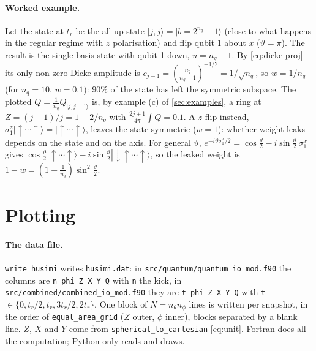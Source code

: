 \documentclass[11pt,a4paper]{article}
\newcommand{\up}{{\uparrow}}
\newcommand{\dn}{{\downarrow}}
\begin{document}
\paragraph{Worked example.} Let the state at $t_r$ be the all-up state $|j,j\rangle = |b = 2^{n_q}-1\rangle$ (close to
what happens in the regular regime with $z$ polarisation) and flip qubit 1 about $x$ ($\vartheta = \pi$). The result is
the single basis state with qubit 1 down, $u = n_q-1$. By \eqref{eq:dicke-proj} its only non-zero Dicke amplitude is $c_{j-1} =
\binom{n_q}{n_q-1}^{-1/2} = 1/\sqrt{n_q}$, so $w = 1/n_q$ (for $n_q = 10$, $w = 0.1$): $90\%$ of the state has left
the symmetric subspace. The plotted $Q = \frac{1}{n_q}Q_{|j,j-1\rangle}$ is, by example (c) of \cref{sec:examples}, a
ring at $Z = (j-1)/j = 1-2/n_q$ with $\frac{2j+1}{4\pi}\int Q = 0.1$. A $z$ flip instead, $\sigma^z_1|\up\cdots\up\rangle =
|\up\cdots\up\rangle$, leaves the state symmetric ($w = 1$): whether weight leaks depends on the state and on the axis.
For general $\vartheta$, $e^{-i\vartheta\sigma^x_1/2} = \cos\frac\vartheta2 - i\sin\frac\vartheta2\,\sigma^x_1$ gives
$\cos\frac\vartheta2|\up\cdots\up\rangle - i\sin\frac\vartheta2|\dn\up\cdots\up\rangle$, so the leaked weight is
$1-w = (1-\frac1{n_q})\sin^2\frac\vartheta2$.

\section{Plotting}\label{sec:plotting}

\paragraph{The data file.} \texttt{write\_husimi} writes \texttt{husimi.dat}: in \texttt{src/quantum/quantum\_io\_mod.f90}
the columns are \texttt{n phi Z X Y Q} with \texttt{n} the kick, in \texttt{src/combined/combined\_io\_mod.f90} they are
\texttt{t phi Z X Y Q} with \texttt{t} $\in\{0,t_r/2,t_r,3t_r/2,2t_r\}$. One block of $N = n_\theta n_\phi$ lines is written per
snapshot, in the order of \texttt{equal\_area\_grid} ($Z$ outer, $\phi$ inner), blocks separated by a blank line.
$Z$, $X$ and $Y$ come from \texttt{spherical\_to\_cartesian} \eqref{eq:unit}. Fortran does all the computation; Python
only reads and draws.
\end{document}
